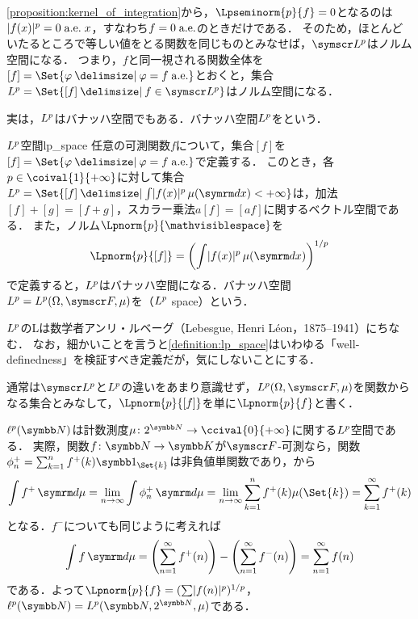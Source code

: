\documentclass[../../main]{subfiles}
\begin{document}
\cref{proposition:kernel_of_integration}から，\(\Lpseminorm{p}{f}=0\)となるのは\(\abs{f(x)}^p=0\almosteverywhere[][x]\)，すなわち\(f=0\almosteverywhere\)のときだけである．
そのため，ほとんどいたるところで等しい値をとる関数を同じものとみなせば，\(\Lebesgue*{p}\)はノルム空間になる．
つまり，\(f\)と同一視される関数全体を\([f]=\Set{\varphi\given\varphi=f\almosteverywhere}\)とおくと，集合\(\Lebesgue{p}=\Set{[f]\given f\in\Lebesgue*{p}}\)はノルム空間になる．

実は，\(\Lebesgue{p}\)はバナッハ空間でもある．バナッハ空間\(\Lebesgue{p}\)をという．

\begin{definition}{\(\Lebesgue{p}\)空間}{lp_space}
  任意の可測関数\(f\)について，集合\([f]\)を\([f]=\Set{\varphi\given\varphi=f\almosteverywhere}\)で定義する．
  このとき，各\(p\in\coival{1}{+\infty}\)に対して集合\(\Lebesgue{p}=\Set{[f]\given\int\abs{f(x)}^p\measured[x]{\mu}<+\infty}\)は，加法\([f]+[g]=[f+g]\)，スカラー乗法\(a[f]=[af]\)に関するベクトル空間である．
  また，ノルム\(\Lpnorm{p}{\holder}\)を
  \[
    \Lpnorm{p}{[f]} = \pqty*{\int\abs{f(x)}^p\measured[x]{\mu}}^{1/p}
  \]
  で定義すると，\(\Lebesgue{p}\)はバナッハ空間になる．バナッハ空間\(\Lebesgue{p}=\Lebesgue{p}(\Omega,\sigmaalg{F},\mu)\)を（\(\Lebesgue{p}\) space）という．
\end{definition}

\begin{note}
  \(\Lebesgue{p}\)のLは数学者アンリ・ルベーグ（Lebesgue, Henri Léon，1875–1941）にちなむ．
  なお，細かいことを言うと\cref{definition:lp_space}はいわゆる「well‐definedness」を検証すべき定義だが，気にしないことにする．
\end{note}

通常は\(\Lebesgue*{p}\)と\(\Lebesgue{p}\)の違いをあまり意識せず，\(\Lebesgue{p}(\Omega,\sigmaalg{F},\mu)\)を関数からなる集合とみなして，\(\Lpnorm{p}{[f]}\)を単に\(\Lpnorm{p}{f}\)と書く．

\begin{example}
  \(\lebesgue{p}(\numset{N})\)は計数測度\(\mu\colon\powerset{\numset{N}}\to\ccival{0}{+\infty}\)に関する\(\Lebesgue{p}\)空間である．
  実際，関数\(f\colon\numset{N}\to\numset{K}\)が\(\sigmaalg{F}\)‐可測なら，関数\(\phi^{\mathord{+}}_n=\sum_{k=1}^nf^{\mathord{+}}(k)\indicator_{\Set{k}}\)は非負値単関数であり，から
  \[
    \int f^{\mathord{+}}\measured{\mu} = \lim_{n\to\infty}\int\phi_n^{\mathord{+}}\measured{\mu}
    = \lim_{n\to\infty}\sum_{k=1}^nf^{\mathord{+}}(k)\mu(\Set{k})
    = \sum_{k=1}^\infty f^{\mathord{+}}(k)
  \]
  となる．\(f^{\mathord{-}}\)についても同じように考えれば
  \[
    \int f\measured{\mu} = \pqty*{\sum_{n=1}^\infty f^{\mathord{+}}(n)}-\pqty*{\sum_{n=1}^\infty f^{\mathord{-}}(n)}
    = \sum_{n=1}^\infty f(n)
  \]
  である．よって\(\Lpnorm{p}{f}=(\sum\abs{f(n)}^p)^{1/p}\)，\(\lebesgue{p}(\numset{N})=\Lebesgue{p}(\numset{N},\powerset{\numset{N}},\mu)\)である．
\end{example}
\end{document}
